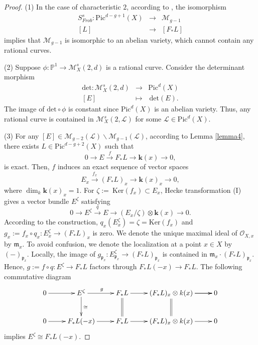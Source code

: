 \documentclass[10pt,a4paper]{amsart}
\begin{document}
\begin{proof}
(1) In the case of characteristic $2$, according to \cite[Theorem 2.5]{Li14}, the isomorphism
\begin{eqnarray}
S^s_{Frob}: \mathrm{Pic}^{d-g+1}(X) & \to & \mathcal{M}_{g-1} \nonumber \\
    \left[L\right] \qquad & \to & \left[F_*L\right] \nonumber
\end{eqnarray}
implies that $\mathcal{M}_{g-1}$ is isomorphic to an abelian variety, which cannot contain any rational curves.

(2) Suppose $\phi: \mathbb{P}^1 \to \mathcal{M}^s_X(2,d)$ is a rational curve. Consider the determinant morphism 
\begin{eqnarray}
    \mathrm{det}: \mathcal{M}^s_X(2,d) &\longrightarrow &  \mathrm{Pic}^d(X) \nonumber \\
  \left[ E \right]  \quad \, &  \longmapsto &   \, \mathrm{det}(E). \nonumber
\end{eqnarray}
The image of $\mathrm{det} \circ \phi$ is constant since $\mathrm{Pic}^d(X)$ is an abelian variety. Thus, any rational curve is contained in $\mathcal{M}^s_X(2,\mathcal{L})$ for some $\mathcal{L} \in \mathrm{Pic}^d(X)$.

(3) For any $[{E}] \in \mathcal{M}_{g-2}(\mathcal{L})\backslash\mathcal{M}_{g-1}(\mathcal{L})$, according to Lemma \ref{lemma4}, there exists $L \in \mathrm{Pic}^{d-g+2}(X)$ such that 
\begin{equation}\label{4.1}
    0 \to E  \xrightarrow{f} F_*L  \to  \textbf{k}(x) \to 0, 
\end{equation}
is exact. Then, $f$ induces an exact sequence of vector spaces  
\begin{equation*}
    E_x  \xrightarrow{f_x} (F_*L)_x \to \textbf{k}(x)_x \to 0,
\end{equation*}
where $\dim_k\textbf{k}(x)_x=1$. 
For $\zeta:=  \ \mathrm{Ker}(f_x) \subset E_x$, Hecke transformation (I) gives a vector bundle $E^{\zeta}$ satisfying 
\begin{equation*}
    0 \to E^{\zeta} \xrightarrow{q} E \to (E_x/\zeta)\otimes \textbf{k}(x) \to 0. 
\end{equation*}
According to the construction, $q_x(E^{\zeta}_x)=\zeta = \mathrm{Ker}(f_x)$ and $g_x:=f_x \circ q_x: E^{\zeta}_x \to (F_*L)_x$
is zero. We denote the unique maximal ideal of $\mathcal{O}_{X,x}$ by $\mathfrak{m}_x$. To avoid confusion, we denote the localization at a point $x\in X$ by $(-)_{\mathfrak{p}_x}$. Locally, the image of 
$g_{\mathfrak{p}_x}:E_{\mathfrak{p}_x}^{\zeta} \to (F_*L)_{\mathfrak{p}_x}$
is contained in $\mathfrak{m}_x \cdot (F_*L)_{\mathfrak{p}_x}$.
Hence, $g:=f\circ q:E^\zeta \to F_*L$ factors through $F_*L(-x) \to F_*L$. The following commutative diagram 
$$\xymatrix{
0 \ar[r] & E^\zeta \ar[r]^{g} \ar[d]^{\cong} & F_*L \ar[r]\ar@{=}[d] & (F_*L)_x \otimes \textbf{k}(x) \ar[r]\ar[r]\ar@{=}[d] & 0\\
0\ar[r]  &F_*L(-x) \ar[r] & F_*L \ar[r] & (F_*L)_x\otimes \textbf{k}(x) \ar[r] & 0}$$
implies $E^\zeta \cong F_*L(-x)$.


\end{proof}
\end{document}
